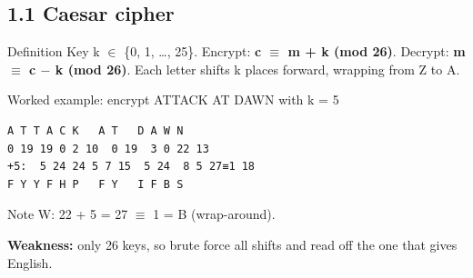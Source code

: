 \documentclass[11pt,a4paper]{article}
\begin{document}
\subsection*{1.1 Caesar cipher}
\begin{concept}{Definition}
Key k \ensuremath{\in} \{0, 1, \ldots{}, 25\}. Encrypt: \textbf{c \ensuremath{\equiv} m + k (mod 26)}. Decrypt: \textbf{m \ensuremath{\equiv} c \ensuremath{-} k (mod 26)}. Each letter shifts k places forward, wrapping from Z to A.\par
\end{concept}
\begin{example}{Worked example: encrypt ATTACK AT DAWN with k = 5}
\begin{workbox}
\begin{Verbatim}[commandchars=\\\{\},fontsize=\footnotesize]
A T T A C K   A T   D A W N
0 19 19 0 2 10  0 19  3 0 22 13
+5:  5 24 24 5 7 15  5 24  8 5 27≡1 18
F Y Y F H P   F Y   I F B S
\end{Verbatim}
\end{workbox}
Note W: 22 + 5 = 27 \ensuremath{\equiv} 1 = B (wrap-around).\par
\end{example}
\textbf{Weakness:} only 26 keys, so brute force all shifts and read off the one that gives English.\par
\end{document}
